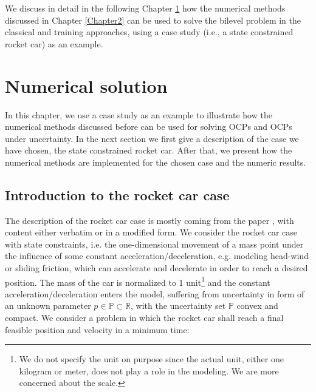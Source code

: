 \documentclass  [
  paper    = a4,
  BCOR     = 10mm,
  twoside,
  fontsize = 12pt,
  fleqn,
  toc      = bibnumbered,
  toc      = listofnumbered,
  numbers  = noendperiod,
  headings = normal,
  listof   = leveldown,
  version  = 3.03
]                                       {scrreprt}
\newcommand{\<}{\langle}
\renewcommand{\>}{\rangle}
\begin{document}
We discuss in detail in the following Chapter \ref{Chapter4} how the numerical methods discussed in Chapter \ref{Chapter2} can be used to solve the bilevel problem in the classical and training approaches, using a case study (i.e., a state constrained rocket car) as an example.

\chapter{Numerical solution}
\label{Chapter4}
In this chapter, we use a case study as an example to illustrate how the numerical methods discussed before can be used for solving OCPs and OCPs under uncertainty. In the next section we first give a description of the case we have chosen, the state constrained rocket car. After that, we present how the numerical methods are implemented for the chosen case and the numeric results.  

\section{Introduction to the rocket car case}

The description of the rocket car case is mostly coming from the paper \cite{MatSch22}, with content either verbatim or in a modified form. We consider the rocket car case with state constraints, i.e. the one-dimensional movement of a mass point under the influence of some constant acceleration/deceleration, e.g. modeling head-wind or sliding friction, which can accelerate and decelerate in order to reach a desired position. The mass of the car is normalized to 1 unit\footnote{We do not specify the unit on purpose since the actual unit, either one kilogram or meter, does not play a role in the modeling. We are more concerned about the scale.} and the constant acceleration/deceleration enters the model, suffering from uncertainty in form of an unknown parameter $p \in  \mathbb{P} \subset \mathbb{R}$, with the uncertainty set $ \mathbb{P}$ convex and compact. We consider a problem in which the rocket car shall reach a final feasible position and velocity in a minimum time: 
\end{document}
